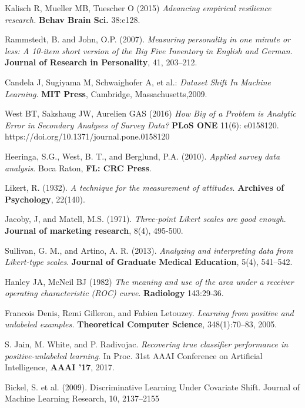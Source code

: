 \begin{thebibliography}{9}

Kalisch R, Mueller MB, Tuescher O (2015) \textit{Advancing empirical resilience research.} \textbf{Behav Brain Sci.} 38:e128.

Rammstedt, B. and John, O.P. (2007). \textit{Measuring personality in one minute or less: A 10-item short version of  the Big Five Inventory in English and German}. \textbf{Journal of Research in Personality}, 41, 203–212. 

Candela J, Sugiyama M, Schwaighofer A, et al.: \textit{Dataset Shift In Machine Learning.} \textbf{MIT Press}, Cambridge, Massachusetts,2009.

West BT, Sakshaug JW, Aurelien GAS (2016) \textit{How Big of a Problem is Analytic Error in Secondary Analyses of Survey Data?} \textbf{PLoS ONE} 11(6): e0158120. https://doi.org/10.1371/journal.pone.0158120

Heeringa, S.G., West, B. T., and Berglund, P.A. (2010). \textit{Applied survey data analysis}. Boca Raton, \textbf{FL: CRC Press}.

Likert, R. (1932). \textit{A technique for the measurement of attitudes}. \textbf{Archives of Psychology}, 22(140).

Jacoby, J, and Matell, M.S. (1971). \textit{Three-point Likert scales are good enough}. \textbf{Journal of marketing research}, 8(4), 495-500.

Sullivan, G. M., and Artino, A. R. (2013). \textit{Analyzing and interpreting data from Likert-type scales}. \textbf{Journal of Graduate Medical Education}, 5(4), 541–542. 

Hanley JA, McNeil BJ (1982) \textit{The meaning and use of the area under a receiver operating characteristic (ROC) curve}. \textbf{Radiology} 143:29-36. 

 Francois Denis, Remi Gilleron, and Fabien Letouzey. \textit{Learning from positive and unlabeled examples.} \textbf{Theoretical Computer Science}, 348(1):70–83, 2005. 

S. Jain, M. White, and P. Radivojac. \textit{Recovering true classifier performance in positive-unlabeled learning}. In Proc. 31st AAAI Conference on Artificial Intelligence, \textbf{AAAI '17}, 2017.

Bickel, S. et al. (2009). Discriminative Learning Under Covariate Shift. Journal of Machine Learning Research, 10, 2137–2155


\end{thebibliography}
